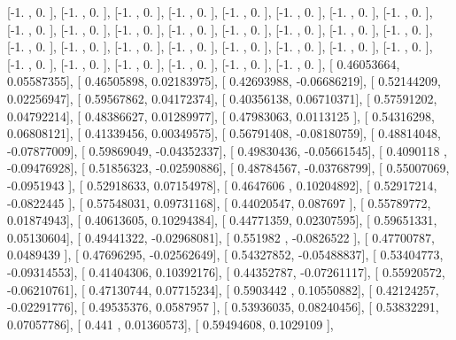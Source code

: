 \documentclass{article}
\begin{document}
       [-1.        ,  0.        ],
       [-1.        ,  0.        ],
       [-1.        ,  0.        ],
       [-1.        ,  0.        ],
       [-1.        ,  0.        ],
       [-1.        ,  0.        ],
       [-1.        ,  0.        ],
       [-1.        ,  0.        ],
       [-1.        ,  0.        ],
       [-1.        ,  0.        ],
       [-1.        ,  0.        ],
       [-1.        ,  0.        ],
       [-1.        ,  0.        ],
       [-1.        ,  0.        ],
       [-1.        ,  0.        ],
       [-1.        ,  0.        ],
       [-1.        ,  0.        ],
       [-1.        ,  0.        ],
       [-1.        ,  0.        ],
       [-1.        ,  0.        ],
       [-1.        ,  0.        ],
       [-1.        ,  0.        ],
       [-1.        ,  0.        ],
       [-1.        ,  0.        ],
       [-1.        ,  0.        ],
       [-1.        ,  0.        ],
       [-1.        ,  0.        ],
       [-1.        ,  0.        ],
       [-1.        ,  0.        ],
       [-1.        ,  0.        ],
       [ 0.46053664,  0.05587355],
       [ 0.46505898,  0.02183975],
       [ 0.42693988, -0.06686219],
       [ 0.52144209,  0.02256947],
       [ 0.59567862,  0.04172374],
       [ 0.40356138,  0.06710371],
       [ 0.57591202,  0.04792214],
       [ 0.48386627,  0.01289977],
       [ 0.47983063,  0.0113125 ],
       [ 0.54316298,  0.06808121],
       [ 0.41339456,  0.00349575],
       [ 0.56791408, -0.08180759],
       [ 0.48814048, -0.07877009],
       [ 0.59869049, -0.04352337],
       [ 0.49830436, -0.05661545],
       [ 0.4090118 , -0.09476928],
       [ 0.51856323, -0.02590886],
       [ 0.48784567, -0.03768799],
       [ 0.55007069, -0.0951943 ],
       [ 0.52918633,  0.07154978],
       [ 0.4647606 ,  0.10204892],
       [ 0.52917214, -0.0822445 ],
       [ 0.57548031,  0.09731168],
       [ 0.44020547,  0.087697  ],
       [ 0.55789772,  0.01874943],
       [ 0.40613605,  0.10294384],
       [ 0.44771359,  0.02307595],
       [ 0.59651331,  0.05130604],
       [ 0.49441322, -0.02968081],
       [ 0.551982  , -0.0826522 ],
       [ 0.47700787,  0.0489439 ],
       [ 0.47696295, -0.02562649],
       [ 0.54327852, -0.05488837],
       [ 0.53404773, -0.09314553],
       [ 0.41404306,  0.10392176],
       [ 0.44352787, -0.07261117],
       [ 0.55920572, -0.06210761],
       [ 0.47130744,  0.07715234],
       [ 0.5903442 ,  0.10550882],
       [ 0.42124257, -0.02291776],
       [ 0.49535376,  0.0587957 ],
       [ 0.53936035,  0.08240456],
       [ 0.53832291,  0.07057786],
       [ 0.441     ,  0.01360573],
       [ 0.59494608,  0.1029109 ],
\end{document}

